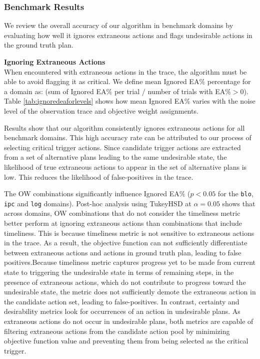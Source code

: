 \subsubsection{Benchmark Results}
We review the overall accuracy of our algorithm in benchmark domains by evaluating how well it ignores extraneous actions and flags undesirable actions in the ground truth plan.

\textbf{Ignoring Extraneous Actions}\\
When encountered with extraneous actions in the trace, the algorithm must be able to avoid flagging it as critical. We define mean Ignored EA\% percentage for a domain as: (sum of Ignored EA\% per trial / number of trials with EA\%$>$0). Table \ref{tab:ignoredeaforlevels} shows how mean Ignored EA\% varies with the noise level of the observation trace and objective weight assignments.

Results show that our algorithm consistently ignores extraneous actions for all benchmark domains. This high accuracy rate can be attributed to our process of selecting critical trigger actions. Since candidate trigger actions are extracted from a set of alternative plans leading to the same undesirable state, the likelihood of true extraneous actions to appear in the set of alternative plans is low. This reduces the likelihood of false-positives in the trace.


The OW combinations significantly influence Ignored EA\%  ($p<0.05$ for the \texttt{blo}, \texttt{ipc} and \texttt{log} domains). Post-hoc analysis using TukeyHSD at $\alpha=0.05$ shows that across domains, OW combinations that do not consider the timeliness metric better perform at ignoring extraneous actions than combinations that include timeliness. This is because timeliness metric is not sensitive to extraneous actions in the trace. As a result, the objective function can not sufficiently differentiate between extraneous actions and actions in ground truth plan, leading to false positives.Because timeliness metric captures progress yet to be made from current state to triggering the undesirable state in terms of remaining steps, in the presence of extraneous actions, which do not contribute to progress toward the undesirable state, the metric does not sufficiently demote the extraneous action in the candidate action set, leading to false-positives. 
In contrast, certainty and desirability metrics look for occurrences of an action in undesirable plans. As extraneous actions do not occur in undesirable plans, both metrics are capable of filtering extraneous actions from the candidate action pool by minimizing objective function value and preventing them from being selected as the critical trigger.


